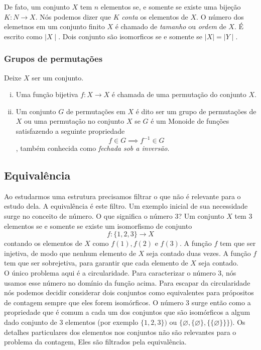          De fato, um conjunto $X$ tem $n$ elementos se, e somente se existe uma bijeção $K: N\to X$. Nós podemos dizer que $K$ \emph{conta}  os elementos de $X$. O número dos elemetnos em um conjunto finito $X$ é chamado de \emph{tamanho} ou \emph{ordem} de $X$. É escrito como $\mid X\mid$. Dois conjunto são isomorficos se e somente se $\mid X\mid = \mid Y\mid$.

      \subsubsection{Grupos de permutações}
         \begin{definition}
            Deixe $X$ ser um conjunto.
            \begin{enumerate}[i.]
               \item Uma função bijetiva $f: X \to X$ é chamada de uma permutação do conjunto $X$.
               \item Um conjunto $G$ de permutações em $X$ é dito ser um grupo de permutações de $X$ ou uma permutação no conjunto $X$ se $G$ é um Monoide de funções satisfazendo a seguinte propriedade $$f \in G \implies f^{-1} \in G$$, também conhecida como \emph{fechada sob a inversão}.
            \end{enumerate}
         \end{definition}

   \subsection{Equivalência}
      Ao estudarmos uma estrutura precisamos filtrar o que não é relevante para o estudo dela. A equivalência é este filtro. Um exemplo inicial de sua necessidade surge no conceito de número. O que significa o número 3? Um conjunto $X$ tem 3 elementos se e somente se existe um isomorfismo de conjunto $$f: \{1,2,3\} \to X$$
      contando os elementos de $X$ como $f(1), f(2)$ e $f(3)$. A função $f$ tem que ser injetiva, de modo que nenhum elemento de $X$ seja contado duas vezes. A função $f$ tem que ser sobrejetiva, para garantir que cada elemento de $X$ seja contado.\\
      O único problema aqui é a circularidade. Para caracterizar o número 3, nós usamos esse número no domínio da função acima. Para escapar da circularidade nós podemos decidir considerar dois conjuntos como equivalentes para própositos de contagem sempre que eles forem isomórficos. O número 3 surge então como a propriedade que é comum a cada um dos conjuntos que são isomórficos a algum dado conjunto de 3 elementos (por exemplo $\{1,2,3\})$ ou $\{\varnothing , \{\varnothing\} , \{\{\varnothing\}\}\}$). Os detalhes particulares dos elementos nos conjuntos não são relevantes para o problema da contagem, Eles são filtrados pela equivalência.
